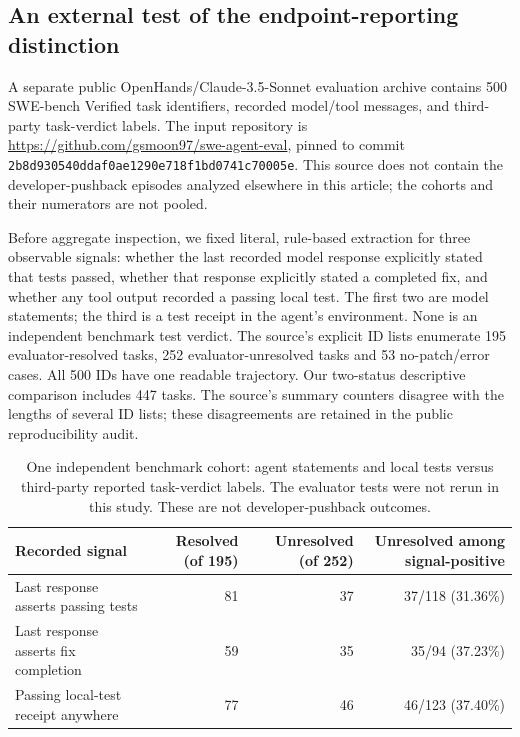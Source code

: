 \subsection{An external test of the endpoint-reporting distinction}
\label{sec:external_contract}
A separate public OpenHands/Claude-3.5-Sonnet evaluation archive contains 500
SWE-bench Verified task identifiers, recorded model/tool messages, and
third-party task-verdict labels. The input repository is
\url{https://github.com/gsmoon97/swe-agent-eval}, pinned to commit
\texttt{2b8d930540ddaf0ae1290e718f1bd0741c70005e}.
This source does not contain the developer-pushback episodes analyzed elsewhere
in this article; the cohorts and their numerators are not pooled.

Before aggregate inspection, we fixed literal, rule-based extraction for
three observable signals: whether the last recorded model response explicitly
stated that tests passed, whether that response explicitly stated a completed
fix, and whether any tool output recorded a passing local test. The first
two are model statements; the third is a test receipt in the agent's environment.
None is an independent benchmark test verdict. The source's explicit ID lists
enumerate 195 evaluator-resolved tasks, 252 evaluator-unresolved tasks and
53 no-patch/error cases. All 500 IDs have one readable trajectory. Our
two-status descriptive comparison includes 447 tasks. The source's summary
counters disagree with the lengths of several ID lists; these disagreements
are retained in the public reproducibility audit.

\begin{table}[htbp]
\centering
\caption{One independent benchmark cohort: agent statements and local tests
versus third-party reported task-verdict labels. The evaluator tests were not
rerun in this study. These are not developer-pushback outcomes.}
\label{tab:external_contract}
\small
\begin{tabularx}{\textwidth}{@{}Xrrr@{}}
\toprule
Recorded signal & Resolved (of 195) & Unresolved (of 252) &
Unresolved among signal-positive \\
\midrule
Last response asserts passing tests & 81 & 37 & 37/118 (31.36\%) \\
Last response asserts fix completion & 59 & 35 & 35/94 (37.23\%) \\
Passing local-test receipt anywhere & 77 & 46 & 46/123 (37.40\%) \\
\bottomrule
\end{tabularx}
\end{table}

